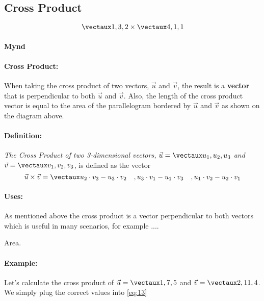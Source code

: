 \documentclass{article}
\begin{document}
\color{white}
\subsection{Cross Product}
\color{black}

\begin{equation*}
\vect{1,3,2}\times \vect{4,1,1} 
\end{equation*}

\paragraph{Mynd} 

\paragraph{Cross Product:} When taking the cross product of two vectors, $\vec{u}$ and $\vec{v}$, the result is a \textbf{vector} that is perpendicular to both $\vec{u}$ and $\vec{v}$. Also, the length of the cross product vector is equal to the area of the parallelogram bordered by $\vec{u}$ and $\vec{v}$ as shown on the diagram above.  

\color{theorem} \paragraph{Definition:} \textit{The Cross Product of two 3-dimensional vectors, $\vec{u} = \vect{u_1, u_2, u_3}$ and $\vec{v}=\vect{v_1,v_2,v_3}$}, is defined as the vector
\begin{equation}\label{eq:13}
\vec{u}\times\vec{v}= \vect{u_2\cdot v_3-u_3\cdot v_2\quad, u_3\cdot v_1-u_1\cdot v_3\quad, u_1\cdot v_2-u_2\cdot v_1}
\end{equation}
\color{black}  

\paragraph{Uses:} As mentioned above the cross product is a vector perpendicular to both vectors which is useful in many scenarios, for example ....

Area. 

\paragraph{Example:} Let's calculate the cross product of $\vec{u}=\vect{1,7,5}$ and $\vec{v}=\vect{2,11,4}$. We simply plug the correct values into \ref{eq:13}
\end{document}
